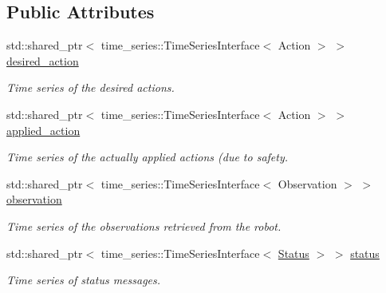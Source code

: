 \subsection*{Public Attributes}
\begin{DoxyCompactItemize}
\item 
\mbox{\label{classrobot__interfaces_1_1RobotData_a03b4160b90de7eac5ffb67cb8a872cee}} 
std\+::shared\+\_\+ptr$<$ time\+\_\+series\+::\+Time\+Series\+Interface$<$ Action $>$ $>$ \hyperlink{classrobot__interfaces_1_1RobotData_a03b4160b90de7eac5ffb67cb8a872cee}{desired\+\_\+action}
\begin{DoxyCompactList}\small\item\em Time series of the desired actions. \end{DoxyCompactList}\item 
\mbox{\label{classrobot__interfaces_1_1RobotData_a05fea4d2f75f7fc34daf2bfc71fbfc4b}} 
std\+::shared\+\_\+ptr$<$ time\+\_\+series\+::\+Time\+Series\+Interface$<$ Action $>$ $>$ \hyperlink{classrobot__interfaces_1_1RobotData_a05fea4d2f75f7fc34daf2bfc71fbfc4b}{applied\+\_\+action}
\begin{DoxyCompactList}\small\item\em Time series of the actually applied actions (due to safety. \end{DoxyCompactList}\item 
\mbox{\label{classrobot__interfaces_1_1RobotData_ae3d13595b92f82f76b0f1df2961258bd}} 
std\+::shared\+\_\+ptr$<$ time\+\_\+series\+::\+Time\+Series\+Interface$<$ Observation $>$ $>$ \hyperlink{classrobot__interfaces_1_1RobotData_ae3d13595b92f82f76b0f1df2961258bd}{observation}
\begin{DoxyCompactList}\small\item\em Time series of the observations retrieved from the robot. \end{DoxyCompactList}\item 
\mbox{\label{classrobot__interfaces_1_1RobotData_a47c53daf923c30981d15008e5134f648}} 
std\+::shared\+\_\+ptr$<$ time\+\_\+series\+::\+Time\+Series\+Interface$<$ \hyperlink{structrobot__interfaces_1_1Status}{Status} $>$ $>$ \hyperlink{classrobot__interfaces_1_1RobotData_a47c53daf923c30981d15008e5134f648}{status}
\begin{DoxyCompactList}\small\item\em Time series of status messages. \end{DoxyCompactList}\end{DoxyCompactItemize}



